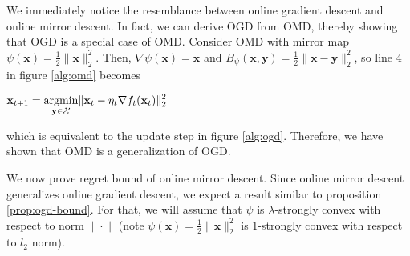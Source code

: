 \documentclass[12pt, a4paper]{report}
\begin{document}
We immediately notice the resemblance between online gradient descent and online mirror descent. In fact, we can derive OGD from OMD, thereby showing that OGD is a special case of OMD. Consider OMD with mirror map $\psi(\mathbf{x}) = \frac{1}{2}\lVert \mathbf{x} \rVert_{2}^2$. Then, $\nabla \psi(\mathbf{x}) = \mathbf{x}$ and $B_\psi(\mathbf{x}, \mathbf{y}) = \frac{1}{2} \lVert \mathbf{x} - \mathbf{y} \rVert_2^2$, so line 4 in figure \ref{alg:omd} becomes 
\begin{center}
    $\displaystyle \mathbf{x}_{t+1} = \operatorname*{argmin}_{\mathbf{y} \in \mathcal{X}} \lVert \mathbf{x}_t - \eta_t \nabla f_t(\mathbf{x}_t) \rVert_2^2$
\end{center}
which is equivalent to the update step in figure \ref{alg:ogd}. Therefore, we have shown that OMD is a generalization of OGD. 

We now prove regret bound of online mirror descent. Since online mirror descent generalizes online gradient descent, we expect a result similar to proposition \ref{prop:ogd-bound}. For that, we will assume that $\psi$ is $\lambda$-strongly convex with respect to norm $\lVert \cdot \rVert$ (note $\psi(\mathbf{x}) = \frac{1}{2}\lVert \mathbf{x} \rVert_2^2$ is $1$-strongly convex with respect to $l_2$ norm). 
\end{document}
